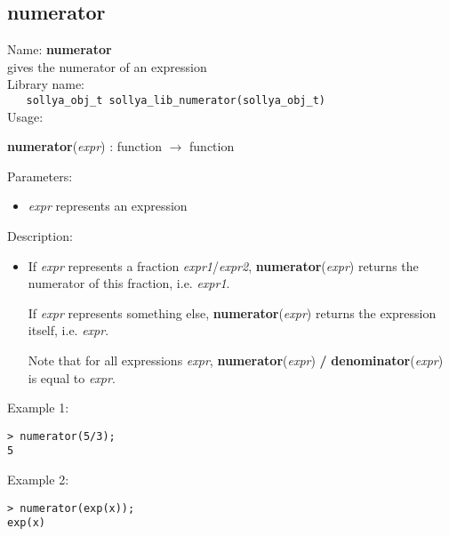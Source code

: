 \subsection{numerator}
\label{labnumerator}
\noindent Name: \textbf{numerator}\\
\phantom{aaa}gives the numerator of an expression\\[0.2cm]
\noindent Library name:\\
\verb|   sollya_obj_t sollya_lib_numerator(sollya_obj_t)|\\[0.2cm]
\noindent Usage: 
\begin{center}
\textbf{numerator}(\emph{expr}) : \textsf{function} $\rightarrow$ \textsf{function}\\
\end{center}
Parameters: 
\begin{itemize}
\item \emph{expr} represents an expression
\end{itemize}
\noindent Description: \begin{itemize}

\item If \emph{expr} represents a fraction \emph{expr1}/\emph{expr2}, \textbf{numerator}(\emph{expr})
   returns the numerator of this fraction, i.e. \emph{expr1}.
    
   If \emph{expr} represents something else, \textbf{numerator}(\emph{expr}) 
   returns the expression itself, i.e. \emph{expr}.
    
   Note that for all expressions \emph{expr}, \textbf{numerator}(\emph{expr}) \textbf{/} \textbf{denominator}(\emph{expr})
   is equal to \emph{expr}.
\end{itemize}
\noindent Example 1: 
\begin{center}\begin{minipage}{15cm}\begin{Verbatim}[frame=single,commandchars=\\\|\~]
> numerator(5/3);
5
\end{Verbatim}
\end{minipage}\end{center}
\noindent Example 2: 
\begin{center}\begin{minipage}{15cm}\begin{Verbatim}[frame=single,commandchars=\\\|\~]
> numerator(exp(x));
exp(x)
\end{Verbatim}
\end{minipage}\end{center}
